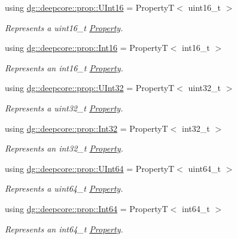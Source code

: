 \begin{DoxyCompactItemize}
using \hyperlink{group___process_properties_gad8c4325c24fef55f796a02753e8620af}{dg\+::deepcore\+::prop\+::\+U\+Int16} = PropertyT$<$ uint16\+\_\+t $>$
\begin{DoxyCompactList}\small\item\em Represents a {\ttfamily uint16\+\_\+t} \hyperlink{classdg_1_1deepcore_1_1_property}{Property}. \end{DoxyCompactList}\item 
using \hyperlink{group___process_properties_ga1dc9580e4c353c4fbe9f0b5908bc474a}{dg\+::deepcore\+::prop\+::\+Int16} = PropertyT$<$ int16\+\_\+t $>$
\begin{DoxyCompactList}\small\item\em Represents an {\ttfamily int16\+\_\+t} \hyperlink{classdg_1_1deepcore_1_1_property}{Property}. \end{DoxyCompactList}\item 
using \hyperlink{group___process_properties_gaf4b72b7a32150a9db0aa1ce09139aa15}{dg\+::deepcore\+::prop\+::\+U\+Int32} = PropertyT$<$ uint32\+\_\+t $>$
\begin{DoxyCompactList}\small\item\em Represents a {\ttfamily uint32\+\_\+t} \hyperlink{classdg_1_1deepcore_1_1_property}{Property}. \end{DoxyCompactList}\item 
using \hyperlink{group___process_properties_gaccf8e71b795f75082ef758708db84edd}{dg\+::deepcore\+::prop\+::\+Int32} = PropertyT$<$ int32\+\_\+t $>$
\begin{DoxyCompactList}\small\item\em Represents an {\ttfamily int32\+\_\+t} \hyperlink{classdg_1_1deepcore_1_1_property}{Property}. \end{DoxyCompactList}\item 
using \hyperlink{group___process_properties_gaf685658c29eaa69a10141e875f7330d7}{dg\+::deepcore\+::prop\+::\+U\+Int64} = PropertyT$<$ uint64\+\_\+t $>$
\begin{DoxyCompactList}\small\item\em Represents a {\ttfamily uint64\+\_\+t} \hyperlink{classdg_1_1deepcore_1_1_property}{Property}. \end{DoxyCompactList}\item 
using \hyperlink{group___process_properties_ga14986faaf41e6ead7ab0b1be59e40d00}{dg\+::deepcore\+::prop\+::\+Int64} = PropertyT$<$ int64\+\_\+t $>$
\begin{DoxyCompactList}\small\item\em Represents an {\ttfamily int64\+\_\+t} \hyperlink{classdg_1_1deepcore_1_1_property}{Property}. \end{DoxyCompactList}\item 

\end{DoxyCompactItemize}
